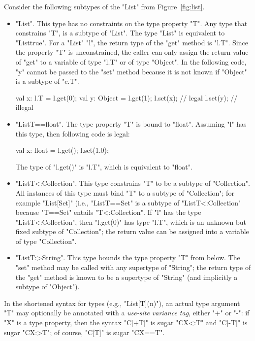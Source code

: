 Consider the following subtypes  of the \xcd"List" from
Figure~\ref{fig:list}.
\begin{itemize}
\item \xcd"List".  This type has no constraints on the type
property \xcd"T".
Any type that constrains \xcd"T",
is a subtype of \xcd"List".  The type \xcd"List" is equivalent to
\xcd"List{true}".
%
For a \xcd"List" \xcd"l", the return type of the \xcd"get" method
is \xcd"l.T".
Since the property \xcd"T" is unconstrained,
the caller can only assign the return value of \xcd"get"
to a variable of type \xcd"l.T" or of type \xcd"Object".
In the following code, \xcd"y" cannot be passed to the \xcd"set" method
because it is not known if \xcd"Object" is a subtype of \xcd"c.T".
\begin{xten}
val x: l.T = l.get(0);
val y: Object = l.get(1);
l.set(x); // legal
l.set(y); // illegal
\end{xten}

\item \xcd"List{T==float}".
The type property \xcd"T" is bound to \xcd"float".
Assuming \xcd"l" has this type, then following code is legal:
\begin{xten}
val x: float = l.get();
l.set(1.0);
\end{xten}
The type of \xcd"l.get()" is \xcd"l.T", which is equivalent to
\xcd"float".

\item \xcd"List{T<:Collection}".
This type constrains \xcd"T" to be a subtype of \xcd"Collection".
All instances of this type must bind \xcd"T" to a subtype of
\xcd"Collection"; for example \xcd"List[Set]" (i.e.,
\xcd"List{T==Set}" is a subtype of
\xcd"List{T<:Collection}" because \xcd"T==Set" entails
\xcd"T<:Collection".
%
If \xcd"l" has the type \xcd"List{T<:Collection}",
then \xcd"l.get(0)" has type \xcd"l.T", which is an unknown but
fixed subtype of \xcd"Collection"; the return value can be
assigned into a variable of type \xcd"Collection".

\item \xcd"List{T:>String}".  This type bounds the type property
\xcd"T"
from below.  The \xcd"set" method may be called with any
supertype of \xcd"String"; the return type of the \xcd"get"
method is known to be a
supertype of \xcd"String" (and implicitly a subtype of \xcd"Object").
\end{itemize}

In the shortened syntax for types (e.g., \xcd"List[T](n)"),
an actual type argument \xcd"T" may optionally
be annotated
with
a \emph{use-site variance tag}, either \xcd"+" or \xcd"-":
if \xcd"X" is a type property, then
the syntax \xcd"C[+T]" is sugar \xcd"C{X<:T}" and
\xcd"C[-T]" is sugar \xcd"C{X:>T}"; of course,
\xcd"C[T]" is sugar \xcd"C{X==T}".

